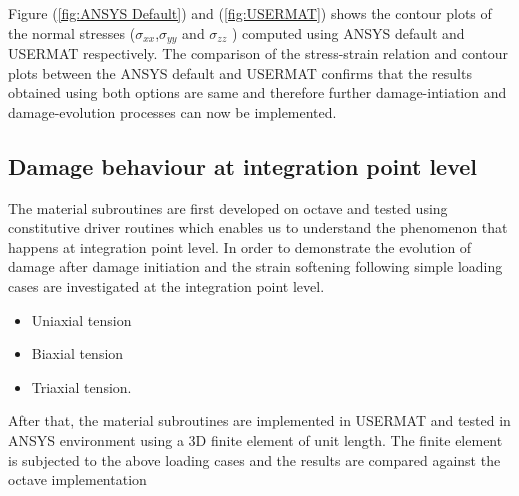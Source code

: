 \documentclass[a4paper,12pt]{extarticle}
\begin{document}
Figure (\ref{fig:ANSYS Default}) and (\ref{fig:USERMAT}) shows the contour plots of the normal stresses ($\sigma_{xx}$,$\sigma_{yy}$ and $\sigma_{zz}$ ) computed using ANSYS default and USERMAT respectively. The comparison of the stress-strain relation and contour plots between the ANSYS default and USERMAT confirms that the results obtained using both options are same and therefore further damage-intiation and damage-evolution processes can now be implemented.

\subsection*{Damage behaviour at integration point level}
\indent\indent\indent The material subroutines are first developed on octave and tested using constitutive driver routines which enables us to understand the phenomenon that happens at integration point level. In order to demonstrate the evolution of damage after damage initiation and the strain softening following simple loading cases are investigated at the integration point level.
\begin{itemize}
\item Uniaxial tension
\item Biaxial tension
\item Triaxial tension.
\end{itemize} 
After that, the material subroutines are implemented in USERMAT and tested in ANSYS environment using a 3D finite element of unit length. The finite element is subjected to the above loading cases and the results are compared against the octave implementation
\FloatBarrier
\end{document}
